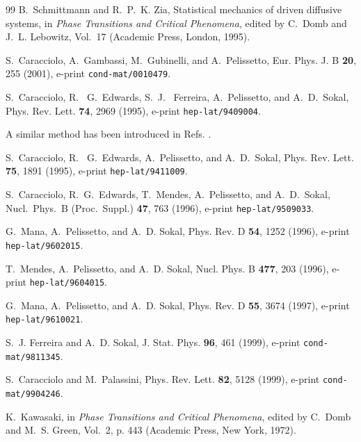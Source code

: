 \documentclass[12pt]{article}
\begin{document}
\begin{thebibliography}{99}
B.~Schmittmann and R.~P.~K. Zia,
\newblock Statistical mechanics of driven diffusive systems,
\newblock in {\em Phase Transitions and Critical Phenomena}, edited by C.~Domb
  and J.~L. Lebowitz, Vol.~17 (Academic Press, London, 1995).

S.~Caracciolo, A.~Gambassi, M.~Gubinelli, and A.~Pelissetto,
Eur. Phys. J.  B {\bf 20}, 255 (2001),
e-print {\tt cond-mat/0010479}.

{S.~Caracciolo, R.~ G.~Edwards, S.~J.~ Ferreira, A.~Pelissetto, and
  A.~D.~Sokal},
\newblock Phys. Rev. Lett. {\bf 74}, 2969 (1995), 
e-print {\tt hep-lat/9409004}.

A similar method has been introduced in Refs. \cite{Luscher:1991wu,JKKim}.

{S.~Caracciolo, R.~ G.~Edwards, A.~Pelissetto, and A.~D.~Sokal},
\newblock Phys. Rev. Lett. {\bf 75}, 1891 (1995), 
e-print {\tt hep-lat/9411009}.

S.~Caracciolo, R.~G.~Edwards, T.~Mendes, A.~Pelissetto, and A.~D.~Sokal,
\newblock Nucl.\ Phys.\ B (Proc.\ Suppl.)  {\bf 47}, 763 (1996),
e-print {\tt hep-lat/9509033}.

G.~Mana, A.~Pelissetto, and A.~D. Sokal,
\newblock Phys. Rev. D {\bf 54}, 1252 (1996),
e-print {\tt hep-lat/9602015}.

T.~Mendes, A.~Pelissetto, and A.~D. Sokal,
\newblock Nucl. Phys. B {\bf 477}, 203 (1996),
e-print {\tt hep-lat/9604015}.

G.~Mana, A.~Pelissetto, and A.~D. Sokal,
\newblock Phys. Rev. D {\bf 55}, 3674 (1997),
e-print {\tt hep-lat/9610021}.

S.~J. Ferreira and A.~D. Sokal,
\newblock J. Stat. Phys. {\bf 96}, 461 (1999),
e-print {\tt cond-mat/9811345}.

S.~Caracciolo and M.~Palassini,
\newblock Phys. Rev. Lett. {\bf 82}, 5128 (1999),
e-print {\tt cond-mat/9904246}.

K.~Kawasaki,
in {\em Phase Transitions and Critical Phenomena}, edited by C.~Domb
  and M.~S. Green, Vol.~2, p. 443 (Academic Press, New York, 1972).


\end{thebibliography}
\end{document}
